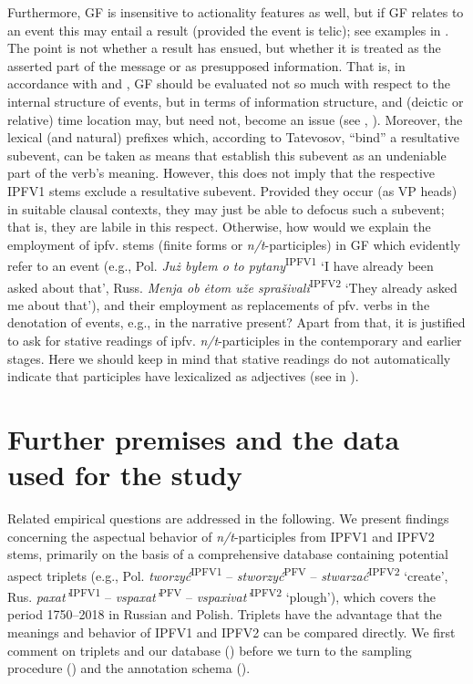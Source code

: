 \documentclass[output=paper]{langscibook}
\begin{document}
Furthermore, GF is insensitive to actionality features as well, but if GF relates to an event this may entail a result (provided the event is telic); see examples in . The point is not whether a result has ensued, but whether it is treated as the asserted part of the message or as presupposed information. That is, in accordance with \citet{Borik.Gehrke2018} and , GF should be evaluated not so much with respect to the internal structure of events, but in terms of information structure, and (deictic or relative) time location may, but need not, become an issue (see , ). Moreover, the lexical (and natural) prefixes which, according to Tatevosov, “bind” a resultative subevent, can be taken as means that establish this subevent as an undeniable part of the verb’s meaning. However, this does not imply that the respective IPFV1 stems exclude a resultative subevent. Provided they occur (as VP heads) in suitable clausal contexts, they may just be able to defocus such a subevent; that is, they are labile in this respect. Otherwise, how would we explain the employment of ipfv. stems (finite forms or \textit{n/t}-participles) in GF which evidently refer to an event (e.g., Pol. \textit{Już byłem o to pytany}\textsuperscript{IPFV1} ‘I have already been asked about that’, Russ. \textit{Menja ob ėtom uže sprašivali}\textsuperscript{IPFV2} ‘They already asked me about that’), and their employment as replacements of pfv. verbs in the denotation of events, e.g., in the narrative present? Apart from that, it is justified to ask for stative readings of ipfv. \textit{n/t}-participles in the contemporary and earlier stages. Here we should keep in mind that stative readings do not automatically indicate that participles have lexicalized as adjectives (see \citealt{Borik.Gehrke2018} in ).

\section{Further premises and the data used for the study}\label{wiem:sec:further-premises}

\sloppy Related empirical questions are addressed in the following. We present findings concerning the aspectual behavior of \textit{n/t}-participles from IPFV1 and IPFV2 stems, primarily on the basis of a comprehensive database containing potential aspect triplets (e.g., Pol. \textit{tworzyć}\textsuperscript{IPFV1} -- \textit{stworzyć}\textsuperscript{PFV} -- \textit{stwarzać}\textsuperscript{IPFV2} ‘create’, Rus. \textit{paxat’}\textsuperscript{IPFV1} -- \textit{vspaxat’}\textsuperscript{PFV} -- \textit{vspaxivat’}\textsuperscript{IPFV2} ‘plough’), which covers the period 1750--2018 in Russian and Polish. Triplets have the advantage that the meanings and behavior of IPFV1 and IPFV2 can be compared directly. We first comment on triplets and our database () before we turn to the sampling procedure () and the annotation schema ().
\end{document}
